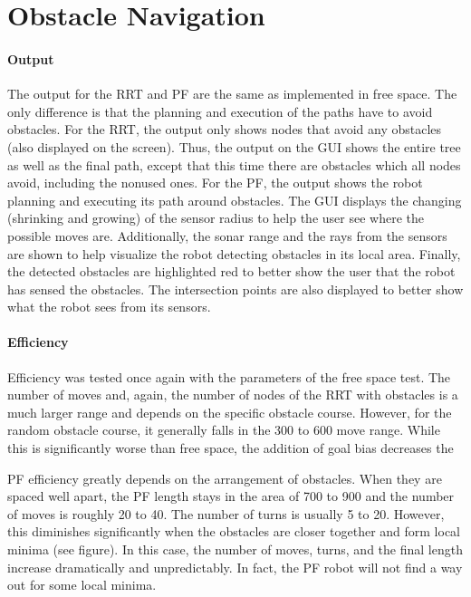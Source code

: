 \documentclass[12pt]{article}
\begin{document}
\section{Obstacle Navigation}
\paragraph*{Output}
The output for the RRT and PF are the same as implemented in free space. The only difference is that the planning and execution of the paths have to avoid obstacles. For the RRT, the output only shows nodes that avoid any obstacles (also displayed on the screen). Thus, the output on the GUI shows the entire tree as well as the final path, except that this time there are obstacles which all nodes avoid, including the nonused ones. For the PF, the output shows the robot planning and executing its path around obstacles. The GUI displays the changing (shrinking and growing) of the sensor radius to help the user see where the possible moves are. Additionally, the sonar range and the rays from the sensors are shown to help visualize the robot detecting obstacles in its local area. Finally, the detected obstacles are highlighted red to better show the user that the robot has sensed the obstacles. The intersection points are also displayed to better show what the robot sees from its sensors.

\paragraph*{Efficiency}
Efficiency was tested once again with the parameters of the free space test.
The number of moves and, again, the number of nodes of the RRT with obstacles is a much larger range and depends on the specific obstacle course. However, for the random obstacle course, it generally falls in the 300 to 600 move range. While this is significantly worse than free space, the addition of goal bias decreases the 

PF efficiency greatly depends on the arrangement of obstacles. When they are spaced well apart, the PF length stays in the area of 700 to 900 and the number of moves is roughly 20 to 40. The number of turns is usually 5 to 20. However, this diminishes significantly when the obstacles are closer together and form local minima (see figure). In this case, the number of moves, turns, and the final length increase dramatically and unpredictably. In fact, the PF robot will not find a way out for some local minima.
\end{document}
